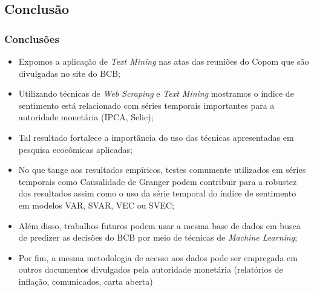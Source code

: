 \documentclass[aspectratio=169]{beamer}
\begin{document}

\subsection{Conclusão}

\begin{frame}\frametitle{Conclusões}
  \begin{itemize}
    \item Expomos a aplicação de \emph{Text Mining} nas atas das reuniões do Copom que são divulgadas no site do BCB;
    \item Utilizando técnicas de \emph{Web Scraping} e \emph{Text Mining} mostramos o índice de sentimento está relacionado com séries temporais importantes para a autoridade monetária (IPCA, Selic);
    \item Tal resultado fortalece a importância do uso das técnicas apresentadas em pesquisa ecocômicas aplicadas;
    \item No que tange aos resultados empíricos, testes comumente utilizados em séries temporais como Causalidade de Granger podem contribuir para a robustez dos resultados assim como o uso da série temporal do índice de sentimento em modelos VAR, SVAR, VEC ou SVEC;
    \item Além disso, trabalhos futuros podem usar a mesma base de dados em busca de predizer as decisões do BCB por meio de técnicas de \emph{Machine Learning};
    \item Por fim, a mesma metodologia de acesso aos dados pode ser empregada em outros documentos divulgados pela autoridade monetária (relatórios de inflação, comunicados, carta aberta)
  \end{itemize}
\end{frame}
\end{document}
